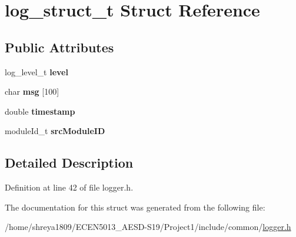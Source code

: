 \hypertarget{structlog__struct__t}{}\section{log\+\_\+struct\+\_\+t Struct Reference}
\label{structlog__struct__t}
\subsection*{Public Attributes}
\begin{DoxyCompactItemize}
\item 
\mbox{\label{structlog__struct__t_ab17eaca1fd2ec886aff4db33efa38d29}} 
log\+\_\+level\+\_\+t {\bfseries level}
\item 
\mbox{\label{structlog__struct__t_a4df114268b4a76cda98a857935e4309a}} 
char {\bfseries msg} \mbox{[}100\mbox{]}
\item 
\mbox{\label{structlog__struct__t_aa081dbf9f7e8bf4b214fedd40eea688e}} 
double {\bfseries timestamp}
\item 
\mbox{\label{structlog__struct__t_a46674802fa9e76e96243f0164d391696}} 
module\+Id\+\_\+t {\bfseries src\+Module\+ID}
\end{DoxyCompactItemize}


\subsection{Detailed Description}


Definition at line 42 of file logger.\+h.



The documentation for this struct was generated from the following file\+:\begin{DoxyCompactItemize}
\item 
/home/shreya1809/\+E\+C\+E\+N5013\+\_\+\+A\+E\+S\+D-\/\+S19/\+Project1/include/common/\hyperlink{logger_8h}{logger.\+h}\end{DoxyCompactItemize}
